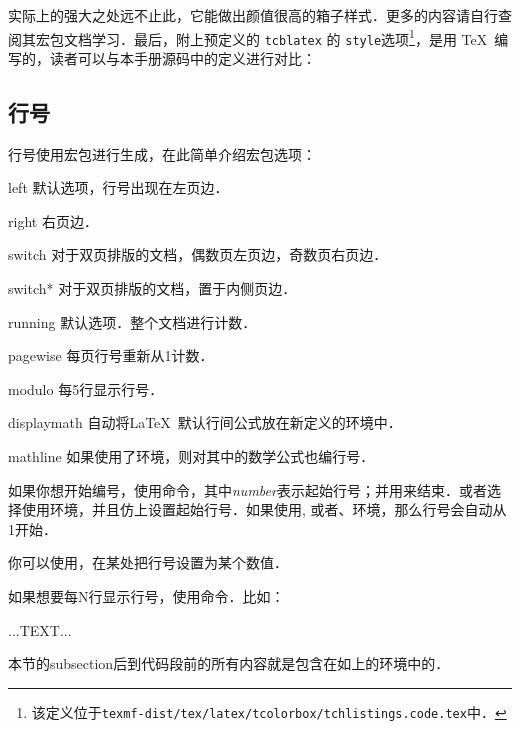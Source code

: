实际上的强大之处远不止此，它能做出颜值很高的箱子样式．更多的内容请自行查阅其宏包文档学习．最后，附上预定义的 \texttt{tcblatex} 的 \texttt{style}选项\footnote{该定义位于\texttt{texmf-dist/tex/latex/tcolorbox/tchlistings.code.tex}中．}，是用 \TeX\ 编写的，读者可以与本手册源码中的定义进行对比：
\begin{latex}
\end{latex}


\subsection{行号}
\begin{linenumbers}
\modulolinenumbers[3]
行号使用宏包进行生成，在此简单介绍宏包选项：
\begin{para}
  \item[left]默认选项，行号出现在左页边．
  \item[right]右页边．
  \item[switch]对于双页排版的文档，偶数页左页边，奇数页右页边．
  \item[switch*]对于双页排版的文档，置于内侧页边．
  \item[running]默认选项．整个文档进行计数．
  \item[pagewise]每页行号重新从1计数．
  \item[modulo]每5行显示行号．
  \item[displaymath]自动将\LaTeX\ 默认行间公式放在新定义的环境中．
  \item[mathline]如果使用了环境，则对其中的数学公式也编行号．
\end{para}

如果你想开始编号，使用命令，其中\textit{number}表示起始行号；并用来结束．或者选择使用环境，并且仿上设置起始行号．如果使用, 或者、环境，那么行号会自动从1开始．

你可以使用，在某处把行号设置为某个数值．

如果想要每N行显示行号，使用命令．比如：
\end{linenumbers}

\begin{latex}
\begin{linenumbers}
    \modulolinenumbers[3]
    ...TEXT...
\end{linenumbers}
\end{latex}

本节的subsection后到代码段前的所有内容就是包含在如上的环境中的．